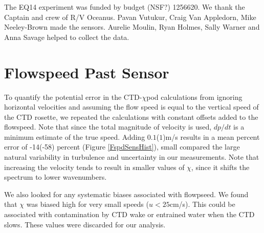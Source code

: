 \documentclass{ametsoc}
\begin{document}
%
\acknowledgments
The EQ14 experiment was funded by budget (NSF?) 1256620. We thank the Captain and crew of R/V Oceanus. Pavan Vutukur, Craig Van Appledorn, Mike Neeley-Brown made the sensors. Aurelie Moulin, Ryan Holmes, Sally Warner and Anna Savage helped to collect the data.

%



\appendix[A]


\section{Flowspeed Past Sensor}

To quantify the potential error in the CTD-$\chi$pod calculations from ignoring horizontal velocities and assuming the flow speed is equal to the vertical speed of the CTD rosette, we repeated the calculations with constant offsets added to the flowspeed. Note that since the total magnitude of velocity is used, $dp/dt$ is a minimum estimate of the true speed. Adding $0.1$($1$)m/s results in a mean percent error of -14(-58) percent (Figure \ref{FspdSensHist}), small compared the large natural variability in turbulence and uncertainty in our measurements. Note that increasing the velocity tends to result in smaller values of $\chi$, since it shifts the spectrum to lower wavenumbers. 

We also looked for any systematic biases associated with flowpseed. We found that $\chi$ was biased high for very small speeds ($u<25$cm/s). This could be associated with contamination by CTD wake or entrained water when the CTD slows.  These values were discarded for our analysis.

\end{document}
